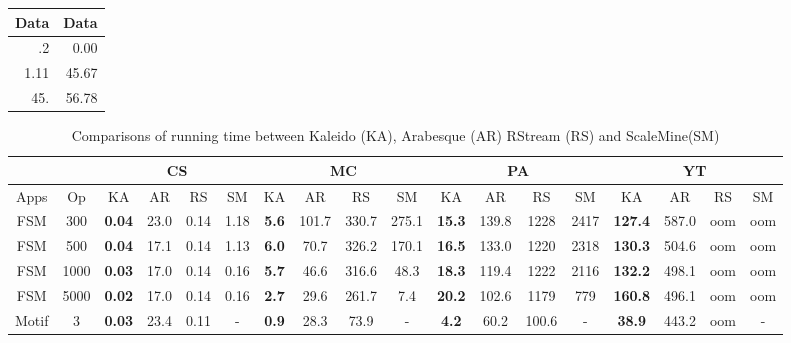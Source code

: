 \documentclass{vldb}
\begin{document}
\begin{table}
       \begin{tabular}{rr} 
              \toprule 
              \textbf{Data} & \textbf{Data} \\
              \midrule   
              .2\hphantom{0} & 0.00 \\ 
              1.11 & 45.67 \\
              45.\hphantom{00} & 56.78 \\
              \bottomrule 
       \end{tabular}
\end{table}
\begin{sidewaystable}[!htp]
       \centering
       \caption{Comparisons of running time between Kaleido (KA), Arabesque (AR) RStream (RS) and ScaleMine(SM)}
       \begin{tabular}{c|c|c|c|c|c|c|c|c|c|c|c|c|c|c|c|c|c}\hline
              \multicolumn{2}{c|}{}     & \multicolumn{4}{c|}{CS}            & \multicolumn{4}{c|}{MC}                & \multicolumn{4}{c|}{PA}               & \multicolumn{4}{c}{YT}             \\ \hline
              Apps    & Op              & KA            & AR   & RS   & SM   & KA             & AR    & RS    & SM    & KA             & AR    & RS    & SM   & KA             & AR    & RS  & SM  \\ \hline
              FSM     & 300             & \textbf{0.04} & 23.0 & 0.14 & 1.18 & \textbf{5.6}   & 101.7 & 330.7 & 275.1 & \textbf{15.3}  & 139.8 & 1228  & 2417 & \textbf{127.4} & 587.0 & oom & oom \\
              FSM     & 500             & \textbf{0.04} & 17.1 & 0.14 & 1.13 & \textbf{6.0}   & 70.7  & 326.2 & 170.1 & \textbf{16.5}  & 133.0 & 1220  & 2318 & \textbf{130.3} & 504.6 & oom & oom \\
              FSM     & 1000            & \textbf{0.03} & 17.0 & 0.14 & 0.16 & \textbf{5.7}   & 46.6  & 316.6 & 48.3  & \textbf{18.3}  & 119.4 & 1222  & 2116 & \textbf{132.2} & 498.1 & oom & oom \\
              FSM     & 5000            & \textbf{0.02} & 17.0 & 0.14 & 0.16 & \textbf{2.7}   & 29.6  & 261.7 & 7.4   & \textbf{20.2}  & 102.6 & 1179  & 779  & \textbf{160.8} & 496.1 & oom & oom \\ \hline
              Motif   & 3               & \textbf{0.03} & 23.4 & 0.11 & -    & \textbf{0.9}   & 28.3  & 73.9  & -     & \textbf{4.2}   & 60.2  & 100.6 & -    & \textbf{38.9}  & 443.2 & oom & -   \\

\end{tabular}
\end{sidewaystable}
\end{document}
